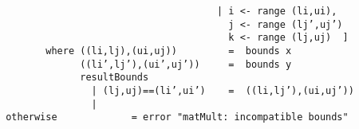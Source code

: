 \mbox{\tt \ \ \ \ \ \ \ \ \ \ \ \ \ \ \ \ \ \ \ \ \ \ \ \ \ \ \ \ \ \ \ \ \ \ \ \ \ \ |\ i\ <-\ range\ (li,ui),}\\
\mbox{\tt \ \ \ \ \ \ \ \ \ \ \ \ \ \ \ \ \ \ \ \ \ \ \ \ \ \ \ \ \ \ \ \ \ \ \ \ \ \ \ \ j\ <-\ range\ (lj',uj')}\\
\mbox{\tt \ \ \ \ \ \ \ \ \ \ \ \ \ \ \ \ \ \ \ \ \ \ \ \ \ \ \ \ \ \ \ \ \ \ \ \ \ \ \ \ k\ <-\ range\ (lj,uj)\ \ ]}\\
\mbox{\tt \ \ \ \ \ \ \ \ where\ ((li,lj),(ui,uj))\ \ \ \ \ \ \ \ \ =\ \ bounds\ x}\\
\mbox{\tt \ \ \ \ \ \ \ \ \ \ \ \ \ \ ((li',lj'),(ui',uj'))\ \ \ \ \ =\ \ bounds\ y}\\
\mbox{\tt \ \ \ \ \ \ \ \ \ \ \ \ \ \ resultBounds}\\
\mbox{\tt \ \ \ \ \ \ \ \ \ \ \ \ \ \ \ \ |\ (lj,uj)==(li',ui')\ \ \ \ =\ \ ((li,lj'),(ui,uj'))}\\
\mbox{\tt \ \ \ \ \ \ \ \ \ \ \ \ \ \ \ \ |\ otherwise\ \ \ \ \ \ \ \ \ \ \ \ \ =\ error\ "matMult:\ incompatible\ bounds"}
\eprog

